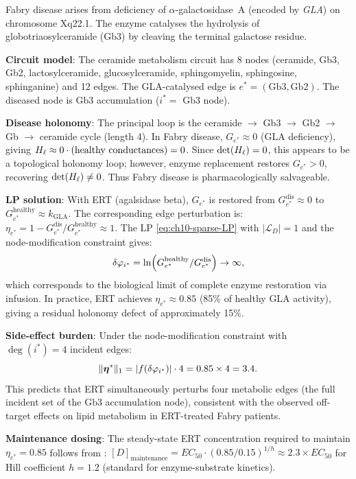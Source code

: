 \begin{example}
\label{ex:fabry}
Fabry disease arises from deficiency of $\alpha$-galactosidase~A (encoded by
\textit{GLA}) on chromosome Xq22.1.  The enzyme catalyses the hydrolysis of
globotriaosylceramide (Gb3) by cleaving the terminal galactose residue.

\textbf{Circuit model}: The ceramide metabolism circuit has 8 nodes
(ceramide, Gb3, Gb2, lactosylceramide, glucosylceramide, sphingomyelin,
sphingosine, sphinganine) and 12 edges.  The GLA-catalysed edge is
$e^* = (\mathrm{Gb3, Gb2})$.  The diseased node is Gb3 accumulation
($i^* =$ Gb3 node).

\textbf{Disease holonomy}: The principal loop is the
ceramide $\to$ Gb3 $\to$ Gb2 $\to$ Gb $\to$ ceramide cycle (length 4).
In Fabry disease, $G_{e^*} \approx 0$ (GLA deficiency), giving
$H_\ell \approx 0 \cdot \text{(healthy conductances)} = 0$.
Since $\det(H_\ell) = 0$, this appears to be a topological holonomy loop;
however, enzyme replacement restores $G_{e^*} > 0$, recovering
$\det(H_\ell) \neq 0$.  Thus Fabry disease is pharmacologically salvageable.

\textbf{LP solution}: With ERT (agalsidase beta), $G_{e^*}$ is restored from
$G_{e^*}^{\mathrm{dis}} \approx 0$ to $G_{e^*}^{\mathrm{healthy}} \approx k_{\mathrm{GLA}}$.
The corresponding edge perturbation is:
$\eta_{e^*} = 1 - G_{e^*}^{\mathrm{dis}} / G_{e^*}^{\mathrm{healthy}} \approx 1$.
The LP \eqref{eq:ch10-sparse-LP} with $|\mathcal{L}_D| = 1$ and the node-modification
constraint gives:
\[
  \delta\varphi_{i^*}
  = \ln(G_{e^*}^{\mathrm{healthy}} / G_{e^*}^{\mathrm{dis}}) \to \infty,
\]
which corresponds to the biological limit of complete enzyme restoration via
infusion.  In practice, ERT achieves $\eta_{e^*} \approx 0.85$ (85\% of
healthy GLA activity), giving a residual holonomy defect of approximately 15\%.

\textbf{Side-effect burden}: Under the node-modification constraint with
$\deg(i^*) = 4$ incident edges:
\[
  \|\boldsymbol{\eta}^*\|_1 = |f(\delta\varphi_{i^*})| \cdot 4
  = 0.85 \times 4 = 3.4.
\]
This predicts that ERT simultaneously perturbs four metabolic edges (the full
incident set of the Gb3 accumulation node), consistent with the observed
off-target effects on lipid metabolism in ERT-treated Fabry patients.

\textbf{Maintenance dosing}: The steady-state ERT concentration required to
maintain $\eta_{e^*} = 0.85$ follows from :
$[D]_{\mathrm{maintenance}} = EC_{50} \cdot (0.85 / 0.15)^{1/h} \approx 2.3
\times EC_{50}$ for Hill coefficient $h = 1.2$ (standard for enzyme-substrate
kinetics).
\end{example}


